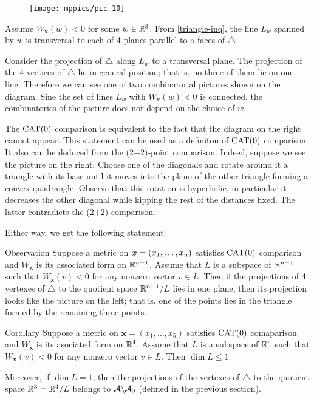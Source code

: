 \documentclass{article}
\begin{document}
\begin{wrapfigure}{r}{33mm}
\vskip-2mm
\centering
\texttt{[image: mppics/pic-10]}
\end{wrapfigure}

Assume $W_{\bm{x}}(w)<0$ for some $w\in\mathbb{R}^3$.
From \ref{triangle-inq}, the line $L_w$ spanned by
$w$ is transversal to each of 4 planes parallel to a faces of $\triangle$.

Consider the projection of $\triangle$ along $L_w$ to a transversal plane. 
The projection of the 4 vertices of $\triangle$ lie in general position; 
that is, no three of them lie on one line.
Therefore  we can see one of two combinatorial pictures shown on the diagram.
Sine the set of lines $L_w$ with $W_{\bm{x}}(w)<0$ is connected,
the combinatorics of the picture does not depend on the choice of $w$.

The $\mathrm{CAT}(0)$ comparison is equivalent to the fact that the diagram on the right cannot appear.
This statement can be used as a definiton of $\mathrm{CAT}(0)$ comparison.
It also can be deduced from the (2+2)-point comparison.
Indeed, suppose we see the picture on the right.
Choose one of the diagonals and rotate  around it a triangle with its base until it moves into the plane of the other triangle forming a convex quadrangle.
Observe that this rotation is hyperbolic, in particular it decreases the other diagonal while kipping the rest of the distances fixed.
The latter contradicts the (2+2)-comparison.


Either way, we get the following statement.


\begin{thm}{Observation}\label{cat0-proj}
Suppose a metric on $\bm{x}\z=(x_1,\dots,x_n)$ satisfies $\mathrm{CAT}(0)$ comparison
and $W_{\bm{x}}$ is its associated form on $\mathbb{R}^{n-1}$.
Assume that $L$ is a subspace of $\mathbb{R}^{n-1}$ such that
$W_{\bm{x}}(v)< 0$ for any nonzero vector $v\in L$.
Then if the projections of 4 vertexes of $\triangle$ to the quotient space $\mathbb{R}^{n-1}/L$ lies in one plane, then its projection looks like the picture on the left;
that is, one of the points lies in the triangle formed by the remaining three points.
\end{thm}

\begin{thm}{Corollary}\label{cor:3+2}
Suppose a metric on $\bm{x}=(x_1,\dots,x_5)$ satisfies $\mathrm{CAT}(0)$ comaparison
and $W_{\bm{x}}$ is its asociated form on $\mathbb{R}^{4}$.
Assume that $L$ is a subspace of $\mathbb{R}^{4}$ such that
$W_{\bm{x}}(v)< 0$ for any nonzero vector $v\in L$.
Then $\dim L\le 1$.

Moreover, if $\dim L= 1$, then the projections of the vertexes of $\triangle$ to the quotient space $\mathbb{R}^3=\mathbb{R}^4/L$ belongs to $\mathcal{A}\backslash\mathcal{A}_0$ (defined in the previous section). 
\end{thm}
\end{document}
